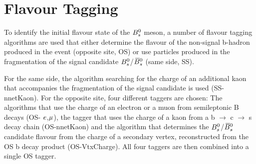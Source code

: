 \clearpage
\section{Flavour Tagging}
\label{sec:Tagging}

To identify the initial flavour state of the ${{B}^0_{s}}$ meson,
a number of flavour tagging algorithms are used that either determine the flavour of the non-signal b-hadron produced in the event (opposite site, OS)
or use particles produced in the fragmentation of the signal candidate ${{B}^0_{s}}$/${{\kern 0.18em\overline{\kern -0.18em B}{}}{}^0_{s}}$ (same side, SS). 

For the same side, the algorithm searching for the charge of an additional kaon that accompanies the fragmentation of the signal candidate is used (SS-nnetKaon). 
For the opposite site, four different taggers are chosen: 
The algorithms that use the charge of an electron or a muon from semileptonic B decays (OS- ${e}$,${\mu}$), the tagger that uses the charge of a kaon from a b $\to$ c $\to$ s decay chain (OS-nnetKaon) 
and the algorithm that determines the ${{B}^0_{s}}$/${{\kern 0.18em\overline{\kern -0.18em B}{}}{}^0_{s}}$ candidate flavour from the charge of a secondary vertex, reconstructed from the OS b decay product (OS-VtxCharge). 
All four taggers are then combined into a single OS tagger. 

